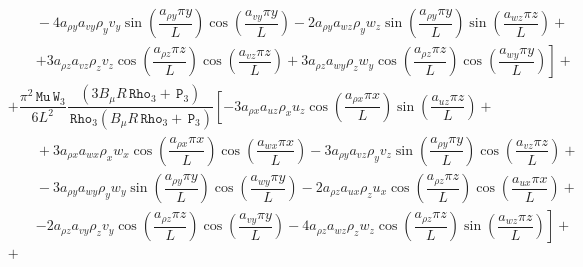 \documentclass[10pt]{article}
\newcommand{\Rho}{\,\mathtt{Rho}}
\newcommand{\PP}{\,\mathtt{P}}
\newcommand{\W}{\,\mathtt{W}}
\newcommand{\MU}{\,\mathtt{Mu}}
\begin{document}
\begin{equation*}
\begin{split}
    &\qquad-4 a_{\rho y} a_{vy} \rho_y v_y \sin\left(\dfrac{a_{\rho y} \pi y}{L}\right) \cos\left(\dfrac{a_{vy} \pi y}{L}\right)-2 a_{\rho y} a_{wz} \rho_y w_z \sin\left(\dfrac{a_{\rho y} \pi y}{L}\right) \sin\left(\dfrac{a_{wz} \pi z}{L}\right)+\\
    &\qquad\left. +3 a_{\rho z} a_{vz} \rho_z v_z \cos\left(\dfrac{a_{\rho z} \pi z}{L}\right) \cos\left(\dfrac{a_{vz} \pi z}{L}\right)+3 a_{\rho z} a_{wy} \rho_z w_y \cos\left(\dfrac{a_{\rho z} \pi z}{L}\right) \cos\left(\dfrac{a_{wy} \pi y}{L}\right)\right] +\\
%
&+\dfrac{ \pi^2 \MU \W_3 }{6L^2} \dfrac{(3 B_\mu R \Rho_3+\PP_3)}{\Rho_3 (B_\mu R \Rho_3+\PP_3) }   \left[-3 a_{\rho x} a_{uz} \rho_x u_z \cos\left(\dfrac{a_{\rho x} \pi x}{L}\right) \sin\left(\dfrac{a_{uz} \pi z}{L}\right)+\right.\\
    &\qquad+3 a_{\rho x} a_{wx} \rho_x w_x \cos\left(\dfrac{a_{\rho x} \pi x}{L}\right) \cos\left(\dfrac{a_{wx} \pi x}{L}\right)-3 a_{\rho y} a_{vz} \rho_y v_z \sin\left(\dfrac{a_{\rho y} \pi y}{L}\right) \cos\left(\dfrac{a_{vz} \pi z}{L}\right)+\\
    &\qquad-3 a_{\rho y} a_{wy} \rho_y w_y \sin\left(\dfrac{a_{\rho y} \pi y}{L}\right) \cos\left(\dfrac{a_{wy} \pi y}{L}\right)-2 a_{\rho z} a_{ux} \rho_z u_x \cos\left(\dfrac{a_{\rho z} \pi z}{L}\right) \cos\left(\dfrac{a_{ux} \pi x}{L}\right)+\\
    &\qquad\left. -2 a_{\rho z} a_{vy} \rho_z v_y \cos\left(\dfrac{a_{\rho z} \pi z}{L}\right) \cos\left(\dfrac{a_{vy} \pi y}{L}\right)-4 a_{\rho z} a_{wz} \rho_z w_z \cos\left(\dfrac{a_{\rho z} \pi z}{L}\right) \sin\left(\dfrac{a_{wz} \pi z}{L}\right)\right] +\\
%
&+
 \end{split}
\end{equation*}
\end{document}
